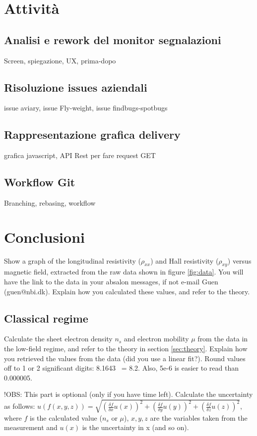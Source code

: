 \documentclass[a4paper]{article}
\begin{document}
\section{Attività}
\subsection{Analisi e rework del monitor segnalazioni}
Screen, spiegazione, UX, prima-dopo
\subsection{Risoluzione issues aziendali}
issue aviary, issue Fly-weight, issue findbugs-spotbugs
\subsection{Rappresentazione grafica delivery}
grafica javascript, API Rest per fare request GET
\subsection{Workflow Git}
Branching, rebasing, workflow


\section{Conclusioni}
Show a graph of the longitudinal resistivity ($\rho_{xx}$) and Hall resistivity ($\rho_{xy}$) versus magnetic field, extracted from the raw data shown in figure \ref{fig:data}. You will have the link to the data in your absalon messages, if not e-mail Guen (guen@nbi.dk). Explain how you calculated these values, and refer to the theory.

\subsection{Classical regime}
Calculate the sheet electron density $n_{s}$ and electron mobility $\mu$ from the data in the low-field regime, and refer to the theory in section \ref{sec:theory}. Explain how you retrieved the values from the data (did you use a linear fit?).
Round values off to 1 or 2 significant digits: 8.1643 ~= 8.2. Also, 5e-6 is easier to read than 0.000005.

!OBS: This part is optional (only if you have time left).
Calculate the uncertainty as follows: \newline $u(f(x, y, z)) = \sqrt{(\frac{\delta f}{\delta{x}} u(x))^{2} + (\frac{\delta f}{\delta{y}} u(y))^{2} + (\frac{\delta f}{\delta{z}} u(z))^{2}}$, where $f$ is the calculated value ($n_{s}$ or $\mu$), $x, y, z$ are the variables taken from the measurement and $u(x)$ is the uncertainty in x (and so on).
\end{document}
